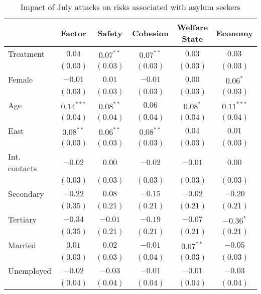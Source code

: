 
\begin{table}
\caption{Impact of July attacks on risks associated with asylum seekers}
\begin{center}
\begin{tabular}{l c c c c c}
\toprule
 & Factor & Safety & Cohesion & Welfare State & Economy \\
\midrule
Treatment     & $0.04$       & $0.07^{**}$ & $0.07^{**}$ & $0.03$      & $0.03$       \\
              & $(0.03)$     & $(0.03)$    & $(0.03)$    & $(0.03)$    & $(0.03)$     \\
Female        & $-0.01$      & $0.01$      & $-0.01$     & $0.00$      & $0.06^{*}$   \\
              & $(0.03)$     & $(0.03)$    & $(0.03)$    & $(0.03)$    & $(0.03)$     \\
Age           & $0.14^{***}$ & $0.08^{**}$ & $0.06$      & $0.08^{*}$  & $0.11^{***}$ \\
              & $(0.04)$     & $(0.04)$    & $(0.04)$    & $(0.04)$    & $(0.04)$     \\
East          & $0.08^{**}$  & $0.06^{**}$ & $0.08^{**}$ & $0.04$      & $0.01$       \\
              & $(0.03)$     & $(0.03)$    & $(0.03)$    & $(0.03)$    & $(0.03)$     \\
Int. contacts & $-0.02$      & $0.00$      & $-0.02$     & $-0.01$     & $0.00$       \\
              & $(0.03)$     & $(0.03)$    & $(0.03)$    & $(0.03)$    & $(0.03)$     \\
Secondary     & $-0.22$      & $0.08$      & $-0.15$     & $-0.02$     & $-0.20$      \\
              & $(0.35)$     & $(0.21)$    & $(0.21)$    & $(0.21)$    & $(0.21)$     \\
Tertiary      & $-0.34$      & $-0.01$     & $-0.19$     & $-0.07$     & $-0.36^{*}$  \\
              & $(0.35)$     & $(0.21)$    & $(0.21)$    & $(0.21)$    & $(0.21)$     \\
Married       & $0.01$       & $0.02$      & $-0.01$     & $0.07^{**}$ & $-0.05$      \\
              & $(0.03)$     & $(0.03)$    & $(0.04)$    & $(0.03)$    & $(0.03)$     \\
Unemployed    & $-0.02$      & $-0.03$     & $-0.01$     & $-0.01$     & $-0.03$      \\
              & $(0.04)$     & $(0.04)$    & $(0.04)$    & $(0.04)$    & $(0.04)$     \\

\end{tabular}
\end{center}
\end{table}
